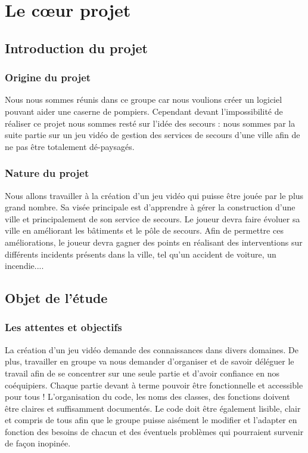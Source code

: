 \section{Le cœur projet}

\subsection{Introduction du projet}
\subsubsection{Origine du projet}
Nous nous sommes réunis dans ce groupe car nous voulions créer un logiciel pouvant aider une caserne de pompiers. Cependant devant l'impossibilité de réaliser ce projet nous sommes resté sur l'idée des secours : nous sommes par la suite partie sur un jeu vidéo de gestion des services de secours d'une ville afin de ne pas être totalement dé-paysagés.

\subsubsection{Nature du projet}
Nous allons travailler à la création d'un jeu vidéo qui puisse être jouée par le plus grand nombre. Sa visée principale est d'apprendre à gérer la construction d'une ville et principalement de son service de secours. Le joueur devra faire évoluer sa ville en améliorant les bâtiments et le pôle de secours. Afin de permettre ces améliorations, le joueur devra gagner des points en réalisant des interventions sur différents incidents présents dans la ville, tel qu'un accident de voiture, un incendie....

\subsection{Objet de l'étude}

\subsubsection{Les attentes et objectifs}
La création d'un jeu vidéo demande des connaissances dans divers domaines. De plus, travailler en groupe va nous demander d'organiser et de savoir déléguer le travail afin de se concentrer sur une seule partie et d'avoir confiance en nos coéquipiers. Chaque partie devant à terme pouvoir être fonctionnelle et accessible pour tous ! L'organisation du code, les noms des classes, des fonctions doivent être claires et suffisamment documentés. Le code doit être également lisible, clair et compris de tous afin que le groupe puisse aisément le modifier et l'adapter en fonction des besoins de chacun et des éventuels problèmes qui pourraient survenir de façon inopinée.


